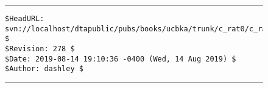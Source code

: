 \vfill
\noindent\begin{figure}[!b]
\noindent\rule[-0.25in]{\textwidth}{1pt}
\begin{tiny}
\begin{verbatim}
$HeadURL: svn://localhost/dtapublic/pubs/books/ucbka/trunk/c_rat0/c_rat0.tex $
$Revision: 278 $
$Date: 2019-08-14 19:10:36 -0400 (Wed, 14 Aug 2019) $
$Author: dashley $
\end{verbatim}
\end{tiny}
\noindent\rule[0.25in]{\textwidth}{1pt}
\end{figure}
%
